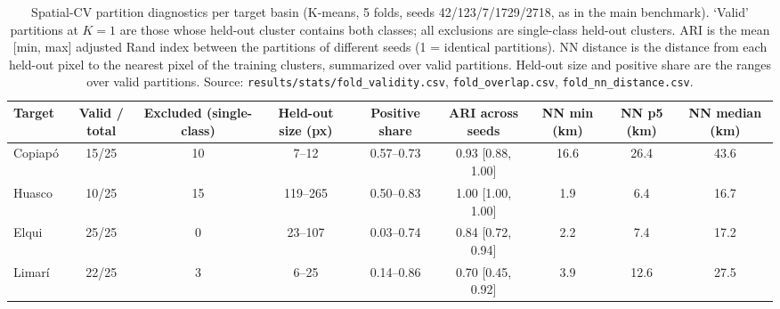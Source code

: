 \begin{table}[ht]
    \centering
    \caption{Spatial-CV partition diagnostics per target basin (K-means, 5 folds, seeds 42/123/7/1729/2718, as in the main benchmark). `Valid' partitions at $K=1$ are those whose held-out cluster contains both classes; all exclusions are single-class held-out clusters. ARI is the mean [min, max] adjusted Rand index between the partitions of different seeds (1 = identical partitions). NN distance is the distance from each held-out pixel to the nearest pixel of the training clusters, summarized over valid partitions. Held-out size and positive share are the ranges over valid partitions. Source: \texttt{results/stats/fold\_validity.csv}, \texttt{fold\_overlap.csv}, \texttt{fold\_nn\_distance.csv}.}
    \label{tab:fold_diagnostics}
    \footnotesize
    \begin{adjustbox}{max width=\textwidth}
    \begin{tabular}{lcccccccc}
        \toprule
        \textbf{Target} & \textbf{Valid / total} & \textbf{Excluded (single-class)} & \textbf{Held-out size (px)} & \textbf{Positive share} & \textbf{ARI across seeds} & \textbf{NN min (km)} & \textbf{NN p5 (km)} & \textbf{NN median (km)} \\
        \midrule
        Copiap\'o & 15/25 & 10 & 7--12 & 0.57--0.73 & 0.93 [0.88, 1.00] & 16.6 & 26.4 & 43.6 \\
        Huasco & 10/25 & 15 & 119--265 & 0.50--0.83 & 1.00 [1.00, 1.00] & 1.9 & 6.4 & 16.7 \\
        Elqui & 25/25 & 0 & 23--107 & 0.03--0.74 & 0.84 [0.72, 0.94] & 2.2 & 7.4 & 17.2 \\
        Limar\'i & 22/25 & 3 & 6--25 & 0.14--0.86 & 0.70 [0.45, 0.92] & 3.9 & 12.6 & 27.5 \\
        \bottomrule
    \end{tabular}
    \end{adjustbox}
\end{table}
